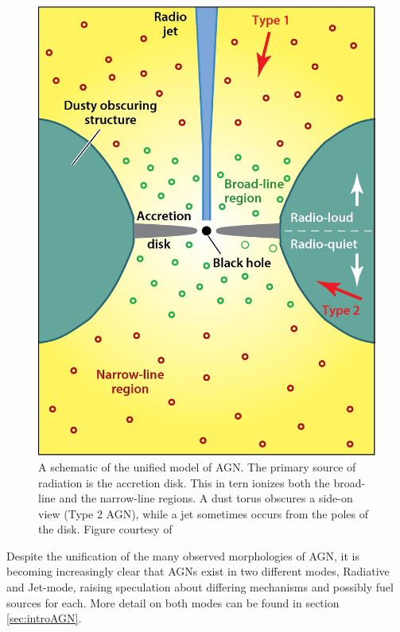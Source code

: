 \begin{figure}
	\centering
	\includegraphics[width=\textwidth]{introduction/unifiedAGN.jpeg}
	\caption[Schematic of unified model of AGN]{A schematic of the unified model of AGN. The primary source of radiation is the accretion disk. This in tern ionizes both the broad-line and the narrow-line regions. A dust torus obscures a side-on view (Type 2 AGN), while a jet sometimes occurs from the poles of the disk. Figure courtesy of \citet{Heckman2014}}
	\label{fig:unifiedAGN}
\end{figure}





Despite the unification of the many observed morphologies of AGN, it is becoming increasingly clear that AGNs exist in two different modes, Radiative and Jet-mode, raising speculation about differing mechanisms and possibly fuel sources for each. More detail on both modes can be found in section \ref{sec:introAGN}. 

